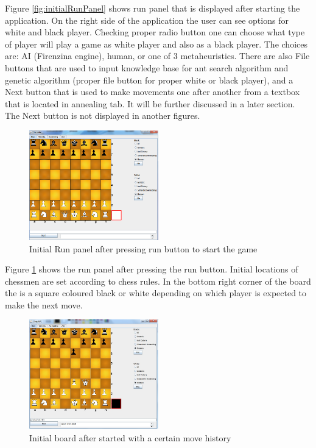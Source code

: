 \documentclass[pdftex]{article}
\begin{document}
Figure \ref{fig:initialRunPanel} shows run panel that is displayed after starting the application. On the right side of the application the user can see options for white and black player. Checking proper radio button one can choose what type of player will play a game as white player and also as a black player. The choices are: AI (Firenzina engine), human, or one of 3 metaheuristics. There are also File buttons that are used to input knowledge base for ant search algorithm and genetic algorithm (proper file button for proper white or black player), and a Next button that is used to make movements one after another from a textbox that is located in annealing tab. It will be further discussed in a later section. The Next button is not displayed in another figures.

\begin{figure}[!htb]
	\centering
	\includegraphics[width=0.5\textwidth]{chessImages/InitialAfterRun.png} 
	\caption{Initial Run panel after pressing run button to start the game}
	\label{fig:initialRunPanelAfterRun}
\end{figure}

Figure \ref{fig:initialRunPanelAfterRun} shows the run panel after pressing the run button. Initial locations of chessmen are set according to chess rules. In the bottom  right corner of the board the is a square coloured black or white depending on which player is expected to make the next move.

\begin{figure}[!htb]
	\centering
	\includegraphics[width=0.5\textwidth]{chessImages/withHistory.png} 
	\caption{Initial board after started with a certain move history}
	\label{fig:runPanelWithHistory}
\end{figure}
\end{document}
